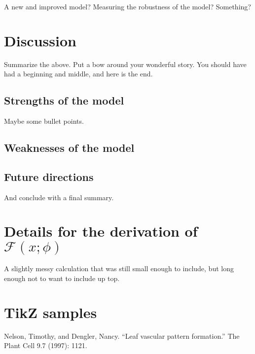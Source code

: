\documentclass[pre,12pt]{revtex4-1}
\begin{document}
A new and improved model? Measuring the robustness of the model? Something? 

\section{Discussion}\label{Discussion}

Summarize the above. Put a bow around your wonderful story. You should have had a beginning and middle, and here is the end. 

\subsection{Strengths of the model}

Maybe some bullet points. 

\subsection{Weaknesses of the model}

\subsection{Future directions}

And conclude with a final summary. 

\appendix

\section{Details for the derivation of $\mathcal{F}(x;\phi)$}\label{AppendixA}

A slightly messy calculation that was still small enough to include, but long enough not to want to include up top.

\section{TikZ samples}



\begin{thebibliography}{10}
 Nelson, Timothy, and Dengler, Nancy. ``Leaf vascular pattern formation.'' The Plant Cell 9.7 (1997): 1121.
\end{thebibliography}
\end{document}
